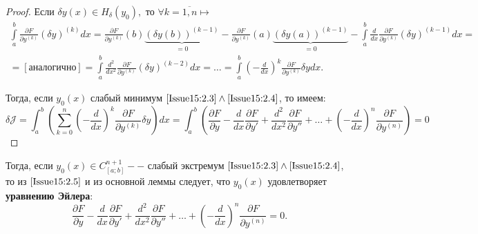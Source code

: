 \begin{proof}
Если $\delta y(x)\in H_\delta(y_0),$ то $\forall k=\overline{1,n} \mapsto $
\begin{multline*}
    \int \limits_a^b \frac{\partial F}{\partial y^{(k)}}(\delta y)^{(k)} dx = \frac{\partial F}{\partial y^{(k)}}(b) \underbrace{(\delta y(b))^{(k-1)}}_{= 0} - \frac{\partial F}{\partial y^{(k)}}(a) \underbrace{(\delta y(a))^{(k-1)}}_{= 0} - \int\limits_a^b\frac{d}{dx}\frac{\partial F}{\partial y^{(k)}}(\delta y)^{(k-1)}dx = \\ 
    =[\text{аналогично}]=\int\limits_a^b \frac{d^2}{dx^2}\frac{\partial F}{\partial y^{(k)}}(\delta y)^{(k-2)}dx = \dots = \int\limits^b_a \left(-\frac{d}{dx} \right)^k\frac{\partial F}{\partial y^{(k)}}\delta y dx.    
\end{multline*} 
 

Тогда, если $y_0(x)$ слабый минимум $\eqref{Issue15:2.3}\wedge\eqref{Issue15:2.4}$, то имеем: 
\begin{equation}
    \label{Issue15:2.5}
    \delta\mathcal{J} = \int_a^b \left( \sum_{k=0}^n \left(-\frac{d}{dx} \right)^k\frac{\partial F}{\partial y^{(k)}}\delta y \right) dx = \int_a^b \left(\frac{\partial F}{\partial y} - \frac{d}{dx}\frac{\partial F}{\partial y'} + \frac{d^2}{dx^2}\frac{\partial F}{\partial y''} + \dots + \left( -\frac{d}{dx}\right)^n  \frac{\partial F}{\partial y^{(n)}} \right) = 0
\end{equation}
\end{proof}
Тогда, если $y_0(x)\in C^{n+1}_{[a;b]}--$ слабый экстремум $\eqref{Issue15:2.3}\wedge\eqref{Issue15:2.4}$, то из $\eqref{Issue15:2.5}$ и из основной леммы следует, что $y_0(x)$ удовлетворяет \textbf{уравнению Эйлера}:
\begin{equation}
    \label{Issue15:2.6}
    \frac{\partial F}{\partial y} - \frac{d}{dx}\frac{\partial F}{\partial y'}+\frac{d^2}{dx^2}\frac{\partial F}{\partial y''} + \dots + \left( -\frac{d}{dx} \right)^n\frac{\partial F}{\partial y^{(n)}} = 0.
\end{equation}
